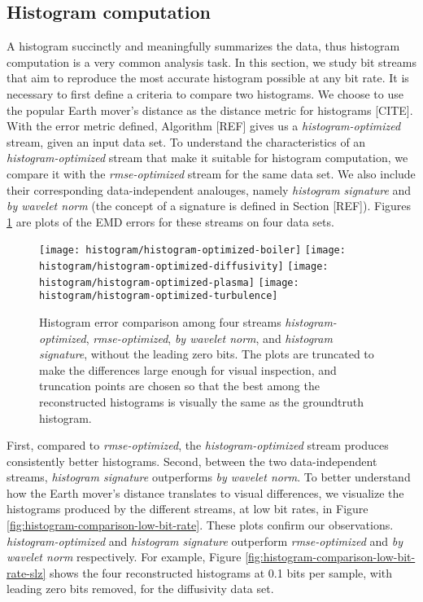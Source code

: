 
\subsection{Histogram computation}
\label{sec:histogram}

A histogram succinctly and meaningfully summarizes the data, thus histogram computation is a very
common analysis task. In this section, we study bit streams that aim to reproduce the most accurate
histogram possible at any bit rate. It is necessary to first define a criteria to compare two
histograms. We choose to use the popular Earth mover's distance as the distance metric for
histograms [CITE]. With the error metric defined, Algorithm [REF] gives us a
\emph{histogram-optimized} stream, given an input data set. To understand the characteristics of an
\emph{histogram-optimized} stream that make it suitable for histogram computation, we compare it
with the \emph{rmse-optimized} stream for the same data set. We also include their corresponding
data-independent analouges, namely \emph{histogram signature} and \emph{by wavelet norm} (the
concept of a signature is defined in Section [REF]). Figures \ref{fig:histogram-stream-comparison}
are plots of the EMD errors for these streams on four data sets.

\begin{figure}[h]
	\centering
	{\texttt{[image: histogram/histogram-optimized-boiler]}}
	{\texttt{[image: histogram/histogram-optimized-diffusivity]}}
	{\texttt{[image: histogram/histogram-optimized-plasma]}}
	{\texttt{[image: histogram/histogram-optimized-turbulence]}}
	\caption{Histogram error comparison among four streams \emph{histogram-optimized},
	\emph{rmse-optimized}, \emph{by wavelet norm}, and \emph{histogram signature}, without the leading
	zero bits. The plots are truncated to make the differences large enough for visual inspection, and
	truncation points are chosen so that the best among the reconstructed histograms is visually the
	same as the groundtruth histogram. }
	\label{fig:histogram-stream-comparison}
\end{figure}

First, compared to \emph{rmse-optimized}, the \emph{histogram-optimized} stream produces
consistently better histograms. Second, between the two data-independent streams, \emph{histogram
signature} outperforms \emph{by wavelet norm}. To better understand how the Earth mover's distance
translates to visual differences, we visualize the histograms produced by the different streams, at
low bit rates, in Figure \ref{fig:histogram-comparison-low-bit-rate}. These plots confirm our
observations.
\emph{histogram-optimized} and \emph{histogram signature}
outperform \emph{rmse-optimized} and \emph{by wavelet norm} respectively. For example, Figure
\ref{fig:histogram-comparison-low-bit-rate-slz} shows the four reconstructed histograms at 0.1 bits
per sample, with leading zero bits removed, for the diffusivity data set.

